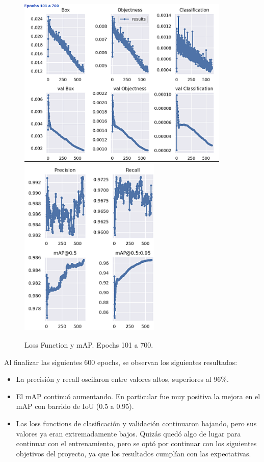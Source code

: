 \begin{figure}
    \centering
    \includegraphics[width=0.9\textwidth]{img/resultados_finales_700_part1_sharped.png}
    \includegraphics[width=0.6\textwidth]{img/resultados_finales_700_part2_sharped.png}
    \caption{Loss Function y mAP. Epochs 101 a 700.}
    \label{fig:loss-functions-map-700}
\end{figure}
Al finalizar las siguientes 600 epochs, se observan los siguientes resultados:
\begin{itemize}
    \item La precisión y recall oscilaron entre valores altos, superiores al 96\%.
    \item El mAP continuó aumentando. En particular fue muy positiva la mejora en el mAP con barrido de IoU (0.5 a 0.95).
    \item Las loss functions de clasificación y validación continuaron bajando, pero sus valores ya eran extremadamente bajos. Quizás quedó algo de lugar para continuar con el entrenamiento, pero se optó por continuar con los siguientes objetivos del proyecto, ya que los resultados cumplían con las expectativas.
\end{itemize}

